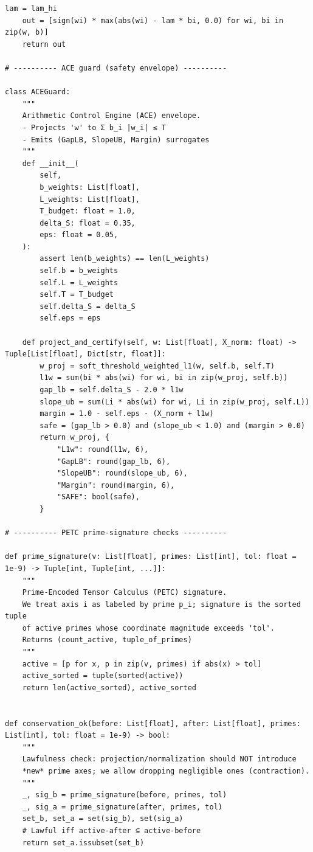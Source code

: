 \documentclass[11pt]{article}
\begin{document}
\begin{lstlisting}[style=py,caption={Mitobit (ACE/PETC revision). Self-contained script with weighted-$\ell_1$ projection, ACE surrogates, and PETC prime-lawfulness.},label={lst:code}]
    lam = lam_hi
    out = [sign(wi) * max(abs(wi) - lam * bi, 0.0) for wi, bi in zip(w, b)]
    return out

# ---------- ACE guard (safety envelope) ----------

class ACEGuard:
    """
    Arithmetic Control Engine (ACE) envelope.
    - Projects 'w' to Σ b_i |w_i| ≤ T
    - Emits (GapLB, SlopeUB, Margin) surrogates
    """
    def __init__(
        self,
        b_weights: List[float],
        L_weights: List[float],
        T_budget: float = 1.0,
        delta_S: float = 0.35,
        eps: float = 0.05,
    ):
        assert len(b_weights) == len(L_weights)
        self.b = b_weights
        self.L = L_weights
        self.T = T_budget
        self.delta_S = delta_S
        self.eps = eps

    def project_and_certify(self, w: List[float], X_norm: float) -> Tuple[List[float], Dict[str, float]]:
        w_proj = soft_threshold_weighted_l1(w, self.b, self.T)
        l1w = sum(bi * abs(wi) for wi, bi in zip(w_proj, self.b))
        gap_lb = self.delta_S - 2.0 * l1w
        slope_ub = sum(Li * abs(wi) for wi, Li in zip(w_proj, self.L))
        margin = 1.0 - self.eps - (X_norm + l1w)
        safe = (gap_lb > 0.0) and (slope_ub < 1.0) and (margin > 0.0)
        return w_proj, {
            "L1w": round(l1w, 6),
            "GapLB": round(gap_lb, 6),
            "SlopeUB": round(slope_ub, 6),
            "Margin": round(margin, 6),
            "SAFE": bool(safe),
        }

# ---------- PETC prime-signature checks ----------

def prime_signature(v: List[float], primes: List[int], tol: float = 1e-9) -> Tuple[int, Tuple[int, ...]]:
    """
    Prime-Encoded Tensor Calculus (PETC) signature.
    We treat axis i as labeled by prime p_i; signature is the sorted tuple
    of active primes whose coordinate magnitude exceeds 'tol'.
    Returns (count_active, tuple_of_primes)
    """
    active = [p for x, p in zip(v, primes) if abs(x) > tol]
    active_sorted = tuple(sorted(active))
    return len(active_sorted), active_sorted


def conservation_ok(before: List[float], after: List[float], primes: List[int], tol: float = 1e-9) -> bool:
    """
    Lawfulness check: projection/normalization should NOT introduce
    *new* prime axes; we allow dropping negligible ones (contraction).
    """
    _, sig_b = prime_signature(before, primes, tol)
    _, sig_a = prime_signature(after, primes, tol)
    set_b, set_a = set(sig_b), set(sig_a)
    # Lawful iff active-after ⊆ active-before
    return set_a.issubset(set_b)


\end{lstlisting}
\end{document}

